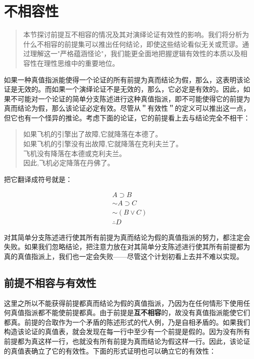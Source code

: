 \section{不相容性}

\begin{quotation}
本节探讨前提互不相容的情况及其对演绎论证有效性的影响。我们将分析为什么不相容的前提集可以推出任何结论，即使这些结论看似无关或荒谬。通过理解这一"严格蕴涵怪论"，我们能更全面地把握逻辑有效性的本质以及相容性在理性思维中的重要地位。
\end{quotation}

如果一种真值指派能使得一个论证的所有前提为真而结论为假，那么，这表明该论证是无效的。而如果一个演绎论证不是无效的，那么，它必定是有效的。因此，如果不可能对一个论证的简单分支陈述进行这种真值指派，即不可能使得它的前提为真而结论为假，那么该论证必定有效。尽管从＂有效性＂的定义可以推出这一点，但它也有一个怪异的推论。考虑下面的论证，它的前提看上去与结论完全不相干：

\begin{quote}
如果飞机的引擎出了故障,它就降落在本德了。\\
如果飞机的引擎没有出故障,它就降落在克利夫兰了。\\
飞机没有降落在本德或克利夫兰。\\
因此,飞机必定降落在丹佛了。
\end{quote}

把它翻译成符号就是：

$$
\begin{aligned}
& A \supset B \\
& \sim A \supset C \\
& \sim(B \vee C) \\
& \therefore D
\end{aligned}
$$

对其简单分支陈述进行使其所有前提为真而结论为假的真值指派的努力，都注定会失败。如果我们忽略结论，把注意力放在对其简单分支陈述进行使其所有前提都为真的真值指派上，我们也一定会失败——尽管这个计划初看上去并不难以实现。

\subsection{前提不相容与有效性}

这里之所以不能获得前提都真而结论为假的真值指派，乃因为在任何情形下使用任何真值指派都不能使前提都真。由于前提是\textbf{互不相容}的，故没有真值指派能使它们都真。前提的合取作为一个矛盾的陈述形式的代人例，乃是自相矛盾的。如果我们构造该论证的真值表，就会发现在每一行中至少有一个前提是假的。因为没有所有前提都为真这样一行，也就没有所有前提为真而结论为假这样一行。因此，该论证的真值表确立了它的有效性。下面的形式证明也可以确立它的有效性：

